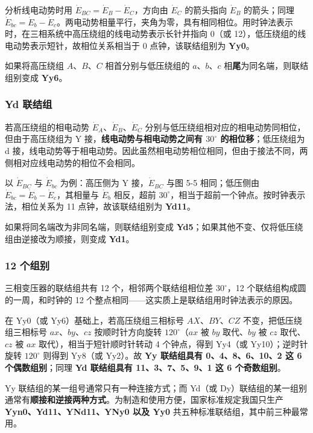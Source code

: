 分析线电动势时用 $\dot E_{BC}=\dot E_B-\dot E_C$，方向由 $\dot E_C$ 的箭头指向 $\dot E_B$ 的箭头；同理 $\dot E_{bc}=\dot E_b-\dot E_c$。两电动势相量平行，夹角为零，具有相同相位。用时钟法表示时，在三相系统中高压绕组的线电动势表示长针并指向 0（或 12），低压绕组的线电动势表示短针，故相位关系相当于 0 点钟，该联结组别为 \textbf{Yy0}。

如果将高压绕组 $A$、$B$、$C$ 相首分别与低压绕组的 $a$、$b$、$c$ 相\textbf{尾}为同名端，则联结组别变成 \textbf{Yy6}。

\subsubsection{Yd 联结组}
若高压绕组的相电动势 $\dot E_A$、$\dot E_B$、$\dot E_C$ 分别与低压绕组相对应的相电动势同相位，但由于高压绕组为 Y 接，\textbf{线电动势与相电动势之间有 $30^\circ$ 的相位移}；低压绕组为 d 接，线电动势等于相电动势。因此虽然相电动势相位相同，但由于接法不同，两侧相对应线电动势的相位不会相同。

以 $\dot E_{BC}$ 与 $\dot E_{bc}$ 为例：高压侧为 Y 接，$\dot E_{BC}$ 与图 5-5 相同；低压侧由 $\dot E_{bc}=\dot E_b-\dot E_c$，其相量与 $\dot E_b$ 相反，超前 $30^\circ$，相当于超前一个钟点。按时钟表示法，相位关系为 11 点钟，故该联结组别为 \textbf{Yd11}。

如果将同名端改为非同名端，则联结组别变成 \textbf{Yd5}；如果其他不变、仅将低压绕组由逆接改为顺接，则变成 \textbf{Yd1}。

\subsubsection{12 个组别}
三相变压器的联结组共有 12 个，相邻两个联结组相位差 $30^\circ$，12 个联结组构成圆的一周，和时钟的 12 个整点相同——这实质上是联结组用时钟法表示的原因。

在 Yy0（或 Yy6）基础上，若高压绕组三相标号 $AX$、$BY$、$CZ$ 不变，把低压绕组三相标号 $ax$、$by$、$cz$ 按顺时针方向旋转 $120^\circ$（$ax$ 被 $by$ 取代、$by$ 被 $cz$ 取代、$cz$ 被 $ax$ 取代），相当于短针顺时针转动 4 个钟点，得到 Yy4（或 Yy10）；逆时针旋转 $120^\circ$ 则得到 Yy8（或 Yy2）。故 \textbf{Yy 联结组具有 0、4、8、6、10、2 这 6 个偶数组别}；同理 \textbf{Yd 联结组具有 11、3、7、5、9、1 这 6 个奇数组别}。

Yy 联结组的某一组号通常只有一种连接方式；而 Yd（或 Dy）联结组的某一组别通常有\textbf{顺接和逆接两种方式}。为制造和使用方便，国家标准规定我国只生产 \textbf{Yyn0、Yd11、YNd11、YNy0 以及 Yy0} 共五种标准联结组，其中前三种最常用。

